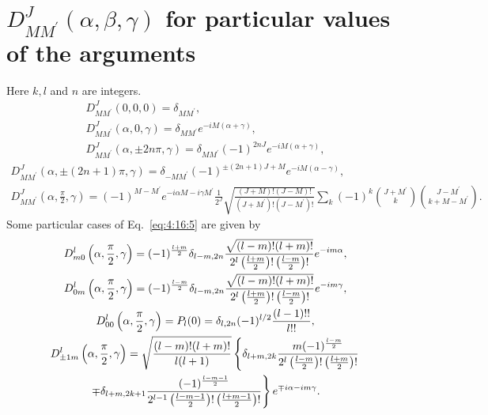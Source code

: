 \section{$D_{M M^{\prime}}^{J}(\alpha, \beta, \gamma)$ for particular values of the arguments}\label{sec:4.16}
Here $k, l$ and $n$ are integers.
\begin{gather}
D_{M M^{\prime}}^{J}(0,0,0)=\delta_{M M^{\prime}} , \label{eq:4:16:1}\\
D_{M M^{\prime}}^{J}(\alpha, 0, \gamma)=\delta_{M M^{\prime}} e^{-i M(\alpha+\gamma)}  ,\label{eq:4:16:2}\\
D_{M M^{\prime}}^{J}(\alpha, \pm 2 n \pi, \gamma)=\delta_{M M^{\prime}}(-1)^{2 n J} e^{-i M(\alpha+\gamma)}, \label{eq:4:16:3}
\end{gather}
\begin{gather}
D_{M M^{\prime}}^{J}(\alpha, \pm(2 n+1) \pi, \gamma)=\delta_{-M M^{\prime}}(-1)^{ \pm(2 n+1) J+M} e^{-i M(\alpha-\gamma)},  \label{eq:4:16:4}\\
D_{M M^{\prime}}^{J}\left(\alpha, \frac{\pi}{2}, \gamma\right)=(-1)^{M-M^{\prime}} e^{-i \alpha M-i \gamma M^{\prime}} \frac{1}{2^{J}} \sqrt{\frac{(J+M)!(J-M)!}{\left(J+M^{\prime}\right)!\left(J-M^{\prime}\right)!}} \sum_{k}(-1)^{k}\binom{J+M^{\prime}}{k}\binom{J-M^{\prime}}{k+M-M^{\prime}} .\label{eq:4:16:5}
\end{gather}
Some particular cases of Eq.~\eqref{eq:4:16:5} are given by
\begin{gather}
D_{m 0}^{l}\left(\alpha, \frac{\pi}{2}, \gamma\right)=(-1)^{\frac{l+m}{2}} \delta_{l-m, 2 n} \frac{\sqrt{(l-m)!(l+m)!}}{2^{l}\left(\frac{l+m}{2}\right)!\left(\frac{l-m}{2}\right)!} e^{-i m \alpha},  \notag\\
D_{0 m}^{l}\left(\alpha, \frac{\pi}{2}, \gamma\right)=(-1)^{\frac{l-m}{2}} \delta_{l-m, 2 n} \frac{\sqrt{(l-m)!(l+m)!}}{2^{l}\left(\frac{l+m}{2}\right)!\left(\frac{l-m}{2}\right)!} e^{-i m \gamma},  \label{eq:4:16:6}\\
D_{00}^{l}\left(\alpha, \frac{\pi}{2}, \gamma\right)=P_{l}(0)=\delta_{l, 2 n}(-1)^{l / 2} \frac{(l-1)!!}{l!!},  \label{eq:4:16:7}\\
D_{ \pm 1 m}^{l}\left(\alpha, \frac{\pi}{2}, \gamma\right)=\sqrt{\frac{(l-m)!(l+m)!}{l(l+1)}}\left\{\delta_{l+m, 2 k} \frac{m(-1)^{\frac{l-m}{2}}}{2^{l}\left(\frac{l-m}{2}\right)!\left(\frac{l+m}{2}\right)!}\right.  \notag\\
\left.\mp \delta_{l+m, 2 k+1} \frac{(-1)^{\frac{l-m-1}{2}}}{2^{l-1}\left(\frac{l-m-1}{2}\right)!\left(\frac{l+m-1}{2}\right)!}\right\} e^{\mp i \alpha-i m \gamma} . \label{eq:4:16:8}
\end{gather}
